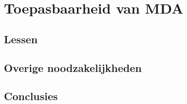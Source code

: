 \section{Toepasbaarheid van MDA}
\subsection{Lessen}
\subsection{Overige noodzakelijkheden}
\subsection{Conclusies}
